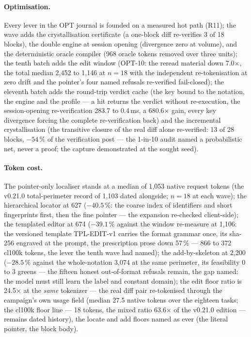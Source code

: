 \documentclass[11pt,a4paper]{article}
\begin{document}
\paragraph{Optimisation.} Every lever in the OPT journal is founded on
a measured hot path (R11); the wave adds the crystallisation certificate
(a one-block diff re-verifies 3 of 18 blocks), the double engine at
session opening (divergence zero at volume), and the deterministic
oracle compiler (968 oracle tokens removed over three units); the
tenth batch adds the edit window (OPT-10: the reread material down
7.0$\times$, the total median 2{,}452 to 1{,}146 at $n{=}18$ with the
independent re-tokenisation at zero drift and the pointer's four
named refusals re-verified fail-closed); the eleventh batch adds the
round-trip verdict cache (the key bound to the notation, the engine
and the profile --- a hit returns the verdict without re-execution,
the session-opening re-verification 283.7 to 0.4\,ms, a 680.6$\times$
gain, every key divergence forcing the complete re-verification
back) and the incremental crystallisation (the transitive closure of
the real diff alone re-verified: 13 of 28 blocks, $-54\,\%$ of the
verification post --- the 1-in-10 audit named a probabilistic net,
never a proof; the capture demonstrated at the sought seed).

\paragraph{Token cost.} The pointer-only localiser stands at a median
of 1{,}053 native request tokens (the v0.21.0 \mbox{total-perimeter} record
of 1{,}103 dated alongside; $n{=}18$ at each wave); the hierarchical
locator at 627 ($-40.5\,\%$: the coarse index of identifiers and
short fingerprints first, then the fine pointer --- the expansion
re-checked client-side); the templated editor at 674 ($-39.1\,\%$
against the window re-measure at 1{,}106: the versioned template
TPL-EDIT-v1 carries the format grammar once, its sha-256 engraved at
the prompt, the prescription prose down 57\,\% --- 866 to 372 cl100k
tokens, the lever the tenth wave had named); the add-by-skeleton at
2{,}200 ($-28.5\,\%$ against the whole-notation 3{,}074 at the same
perimeter, its feasibility 0 to 3 greens --- the fifteen honest
out-of-format refusals remain, the gap named: the model must still
learn the label and constant domain); the edit floor ratio is
24.5$\times$ at the \emph{same} tokenizer --- the real diff pair
re-tokenised through the campaign's own usage field (median 27.5
native tokens over the eighteen tasks; the cl100k floor line --- 18
tokens, the mixed ratio 63.6$\times$ of the v0.21.0 edition ---
remains dated history), the locate and add floors named as ever
(the literal pointer, the block body).
\end{document}
